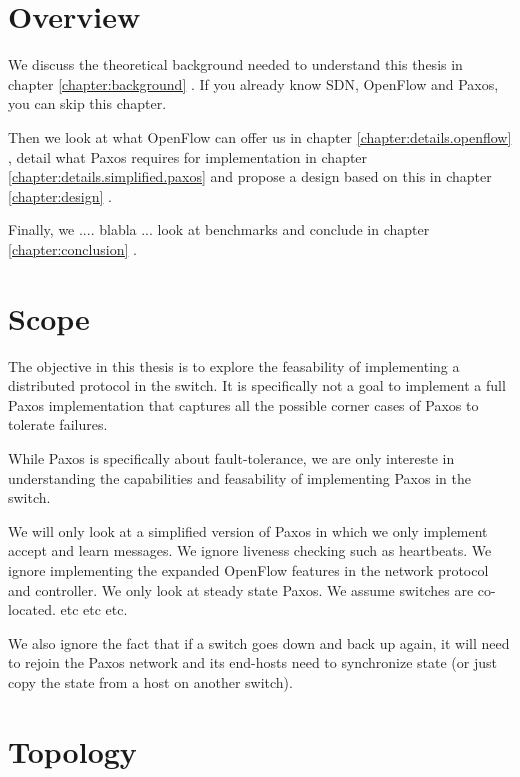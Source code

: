 \section{Overview}

We discuss the theoretical background needed to understand this thesis in
chapter \ref{chapter:background} .  If you already know \acs{SDN},
OpenFlow and Paxos, you can skip this chapter.

Then we look at what OpenFlow can offer us in chapter
\ref{chapter:details.openflow}
, detail what Paxos requires for
implementation in chapter \ref{chapter:details.simplified.paxos} 
 and propose a
design based on this in chapter \ref{chapter:design} .

Finally, we .... blabla ... look at benchmarks and conclude in chapter
\ref{chapter:conclusion} .

\section{Scope}

The objective in this thesis is to explore the feasability of implementing a
distributed protocol in the switch.  It is specifically not a goal to
implement a full Paxos implementation that captures all the possible corner
cases of Paxos to tolerate failures.
%

While Paxos is specifically about fault-tolerance, we are only intereste in
understanding the capabilities and feasability of implementing Paxos in the
switch.

We will only look at a simplified version of Paxos in which we only
implement accept and learn messages. We ignore liveness checking such as
heartbeats. We ignore implementing the expanded OpenFlow features in the
network protocol and controller. We only look at steady state Paxos.
We assume switches are co-located. etc etc etc.

We also ignore the fact that if a switch goes down and back up again, it
will need to rejoin the Paxos network and its end-hosts need to synchronize
state (or just copy the state from a host on another switch).

\section{Topology}

